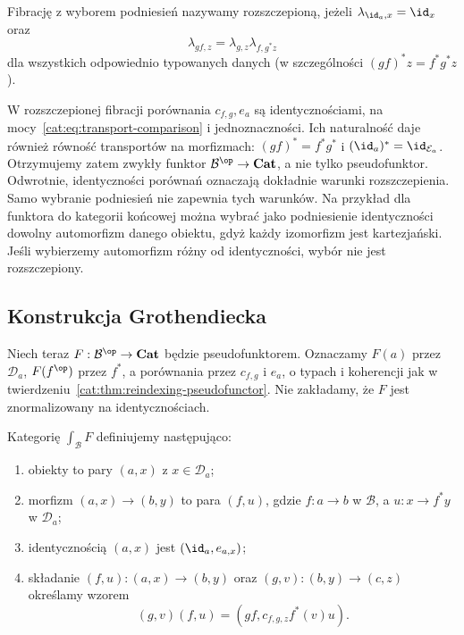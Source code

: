 \begin{definicja}\label{cat:def:split-grothendieck-fibration}
Fibrację z wyborem podniesień nazywamy rozszczepioną, jeżeli $\lambda_{\id_a,x}=\id_x$ oraz
\[
 \lambda_{gf,z}=\lambda_{g,z}\lambda_{f,g^*z}
\]
dla wszystkich odpowiednio typowanych danych (w szczególności $(gf)^*z=f^*g^*z$).
\end{definicja}
W rozszczepionej fibracji porównania $c_{f,g},e_a$ są identycznościami, na mocy~\eqref{cat:eq:transport-comparison} i jednoznaczności. Ich naturalność daje również równość transportów na morfizmach: $(gf)^*=f^*g^*$ i $(\id_a)^*=\id_{\mathcal E_a}$. Otrzymujemy zatem zwykły funktor $\mathcal B^{\op}\to\mathbf{Cat}$, a nie tylko pseudofunktor. Odwrotnie, identyczności porównań oznaczają dokładnie warunki rozszczepienia. Samo wybranie podniesień nie zapewnia tych warunków. Na przykład dla funktora do kategorii końcowej można wybrać jako podniesienie identyczności dowolny automorfizm danego obiektu, gdyż każdy izomorfizm jest kartezjański. Jeśli wybierzemy automorfizm różny od identyczności, wybór nie jest rozszczepiony.

\subsection{Konstrukcja Grothendiecka}

Niech teraz $F:\mathcal B^{\op}\to\mathbf{Cat}$ będzie pseudofunktorem. Oznaczamy $F(a)$ przez $\mathcal D_a$, $F(f^{\op})$ przez $f^*$, a porównania przez $c_{f,g}$ i $e_a$, o typach i koherencji jak w twierdzeniu~\ref{cat:thm:reindexing-pseudofunctor}. Nie zakładamy, że $F$ jest znormalizowany na identycznościach.

\begin{definicja}\label{cat:def:grothendieck-construction}
Kategorię $\int_{\mathcal B}F$ definiujemy następująco:
\begin{enumerate}
 \item obiekty to pary $(a,x)$ z $x\in\mathcal D_a$;
 \item morfizm $(a,x)\to(b,y)$ to para $(f,u)$, gdzie $f:a\to b$ w $\mathcal B$, a $u:x\to f^*y$ w $\mathcal D_a$;
 \item identycznością $(a,x)$ jest $(\id_a,e_{a,x})$;
 \item składanie $(f,u):(a,x)\to(b,y)$ oraz $(g,v):(b,y)\to(c,z)$ określamy wzorem
 \[
 (g,v)(f,u)=(gf,c_{f,g,z}f^*(v)u).
 \]
\end{enumerate}
\end{definicja}

